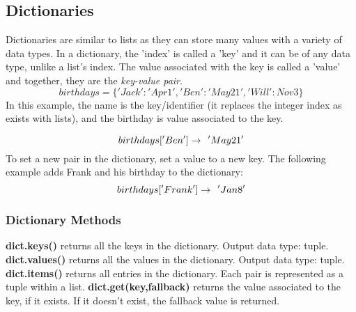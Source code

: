 \subsection{Dictionaries}
Dictionaries are similar to lists as they can store many values with a variety of data types. In a dictionary, the 'index' is called a 'key' and it can be of any data type, unlike a list's index. The value associated with the key is called a 'value' and together, they are the \textit{key-value pair}.\\

\[birthdays = \{'Jack': 'Apr 1', 'Ben': 'May 21', 'Will': Nov 3\}\]
In this example, the name is the key/identifier (it replaces the integer index as exists with lists), and the birthday is value associated to the key.

\[birthdays['Ben'] \rightarrow \hspace{0.15cm} 'May21'\]
To set a new pair in the dictionary, set a value to a new key. The following example adds Frank and his birthday to the dictionary:
\[birthdays['Frank'] \rightarrow \hspace{0.15cm} 'Jan8'\]

\subsubsection{Dictionary Methods}
\textbf{dict.keys()} returns all the keys in the dictionary. Output data type: tuple.\\
\textbf{dict.values()} returns all the values in the dictionary. Output data type: tuple.\\
\textbf{dict.items()} returns all entries in the dictionary. Each pair is represented as a tuple within a list.
\textbf{dict.get(key,fallback)} returns the value associated to the key, if it exists. If it doesn't exist, the fallback value is returned.

